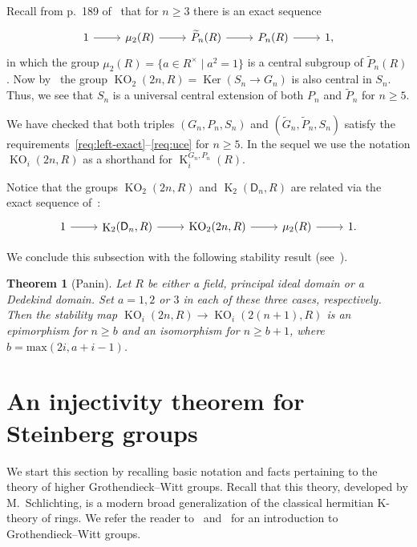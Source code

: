 \documentclass[oneside, 8pt]{amsart}
\newtheorem{externaltheorem}[lemma]{Theorem}
\theoremstyle{remark}
\theoremstyle{definition}
\numberwithin{lemma}{section}
\numberwithin{prop}{section}
\numberwithin{corollary}{section}
\numberwithin{externaltheorem}{section}
\DeclareMathOperator{\Ker}{Ker}
\DeclareMathOperator{\K}{K}
\DeclareMathOperator{\KO}{KO}
\newcommand{\rD}{\mathsf{D}}
\numberwithin{equation}{section}
\begin{document}
Recall from p.~189 of~\cite{Ba74} that for $n\geq 3$ there is an exact sequence
\begin{equation}\label{eq:Bass-ES} \begin{tikzcd} 1 \arrow{r} & \mu_2(R) \arrow{r} & \widetilde{P}_n(R) \arrow{r} & P_n(R) \arrow{r} & 1, \end{tikzcd} \end{equation}
in which the group $\mu_2(R) = \{ a \in R^\times \mid a^2 = 1 \}$ is a central subgroup of $\widetilde{P}_n(R)$.
Now by~\cite[\S~7(v)]{St67} the group $\KO_2(2n, R) = \Ker(S_n \to G_n)$ is also central in $S_n$.
Thus, we see that $S_n$ is a universal central extension of both $P_n$ and $\widetilde{P}_n$ for $n\geq 5$.

We have checked that both triples $(G_n, P_n, S_n)$ and $(\widetilde{G}_n, \widetilde{P}_n, S_n)$ satisfy the requirements~\ref{req:left-exact}--\ref{req:uce} for $n \geq 5$. In the sequel we use the notation $\KO_i(2n, R)$ as a shorthand for $\K_i^{G_n, P_n}(R)$. 

Notice that the groups $\KO_2(2n, R)$ and $\K_2(\rD_n, R)$ are related via the exact sequence of~\cite[Theorem~7.2.12]{HOM}:
\[ \begin{tikzcd} 1 \arrow{r} & \K_2(\rD_n, R) \arrow{r} & \KO_2(2n, R) \arrow{r} & \mu_2(R) \arrow{r} & 1. \end{tikzcd} \]

We conclude this subsection with the following stability result (see~\cite[Theorem~9.4]{Pa89}).
\begin{externaltheorem}[Panin] \label{Panin-stability}
 Let $R$ be either a field, principal ideal domain or a Dedekind domain. Set $a = 1,2$ or $3$ in each of these three cases, respectively.
 Then the stability map $\KO_i(2n, R) \to \KO_i(2(n+1), R)$ is an epimorphism for $n \geq b$ 
 and an isomorphism for $n \geq b + 1$, where $b = \mathrm{max}(2i, a+i-1)$. \end{externaltheorem}

\section{An injectivity theorem for Steinberg groups} \label{firstPart}
We start this section by recalling basic notation and facts pertaining to the theory of higher Grothendieck--Witt groups. Recall that this theory, developed by M.~Schlichting, is a modern broad generalization of the classical hermitian K-theory of rings. We refer the reader to~\cite[\S~2]{FRS12} and~\cite[\S~2]{AF17} for an introduction to Grothendieck--Witt groups.
\end{document}
